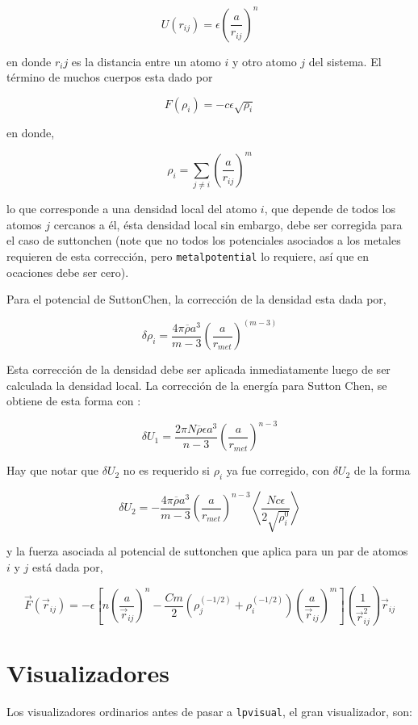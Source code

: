 $$U(r_{ij}) = \epsilon\left(\frac{a}{r_{ij}}\right)^n$$

en donde $r_ij$ es la distancia entre un atomo $i$ y otro atomo $j$ del sistema. El t\'ermino de muchos cuerpos esta dado por

$$F(\rho_{i}) = -c\epsilon\sqrt{\rho_i}$$

en donde,

$$\rho_i = \sum_{j\neq i} \left(\frac{a}{r_{ij}}\right)^m$$

lo que corresponde a una densidad local del atomo $i$, que depende de todos los atomos $j$ cercanos a \'el, \'esta densidad local sin embargo, debe ser corregida para el caso de suttonchen (note que no todos los potenciales asociados a los metales requieren de esta correcci\'on, pero \verb|metalpotential| lo requiere, as\'i que en ocaciones debe ser cero).

Para el potencial de SuttonChen, la correcci\'on de la densidad esta dada por,

$$\delta\rho_i=\frac{4\pi\overline{\rho}a^3}{m-3}\left(\frac{a}{r_{met}}\right)^{(m-3)}$$

Esta correcci\'on de la densidad debe ser aplicada inmediatamente luego de ser calculada la densidad local. La correcci\'on de la energ\'ia para Sutton Chen, se obtiene de esta forma con :

$$\delta U_1 = \frac{2\pi N\overline{\rho}\epsilon a^3}{n-3}\left(\frac{a}{r_{met}}\right)^{n-3}$$

Hay que notar que $\delta U_2$ no es requerido si $\rho_i$ ya fue corregido, con $\delta U_2$ de la forma

$$\delta U_2 = -\frac{4\pi\overline{\rho}a^3}{m-3}\left(\frac{a}{r_{met}}\right)^{n-3}\left<\frac{Nc\epsilon}{2\sqrt{\rho_i^0}}\right>$$

y la fuerza asociada al potencial de suttonchen que aplica para un par de atomos $i$ y $j$ est\'a dada por,

$$\vec{F}(\vec{r}_{ij}) = -\epsilon\left[n\left(\frac{a}{\vec{r}_{ij}}\right)^n - \frac{Cm}{2}(\rho_j^{(-1/2)}+\rho_i^{(-1/2)})\left(\frac{a}{\vec{r}_{ij}}\right)^m\right]\left(\frac{1}{\vec{r}_{ij}^2}\right)\vec{r}_{ij}$$



\section{Visualizadores}
Los visualizadores ordinarios antes de pasar a \verb|lpvisual|, el gran visualizador, son:

